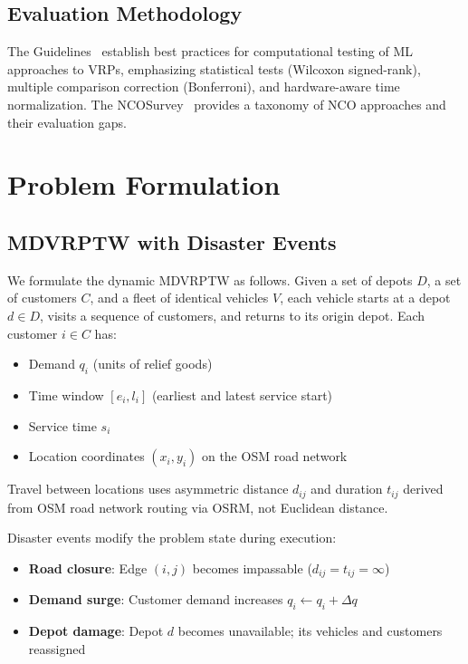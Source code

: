 \documentclass[12pt,a4paper]{article}
\begin{document}
\subsection{Evaluation Methodology}

The Guidelines~\cite{guidelines2021} establish best practices for computational
testing of ML approaches to VRPs, emphasizing statistical tests (Wilcoxon
signed-rank), multiple comparison correction (Bonferroni), and hardware-aware
time normalization. The NCOSurvey~\cite{survey2024} provides a taxonomy of NCO
approaches and their evaluation gaps.

\section{Problem Formulation}

\subsection{MDVRPTW with Disaster Events}

We formulate the dynamic MDVRPTW as follows. Given a set of depots $D$, a set
of customers $C$, and a fleet of identical vehicles $V$, each vehicle starts at
a depot $d \in D$, visits a sequence of customers, and returns to its origin
depot. Each customer $i \in C$ has:

\begin{itemize}
	\item Demand $q_i$ (units of relief goods)
	\item Time window $[e_i, l_i]$ (earliest and latest service start)
	\item Service time $s_i$
	\item Location coordinates $(x_i, y_i)$ on the OSM road network
\end{itemize}

Travel between locations uses asymmetric distance $d_{ij}$ and duration
$t_{ij}$ derived from OSM road network routing via OSRM, not Euclidean
distance.

Disaster events modify the problem state during execution:

\begin{itemize}
	\item \textbf{Road closure}: Edge $(i,j)$ becomes impassable ($d_{ij} = t_{ij} = \infty$)
	\item \textbf{Demand surge}: Customer demand increases $q_i \leftarrow q_i + \Delta q$
	\item \textbf{Depot damage}: Depot $d$ becomes unavailable; its vehicles and customers reassigned
\end{itemize}
\end{document}
